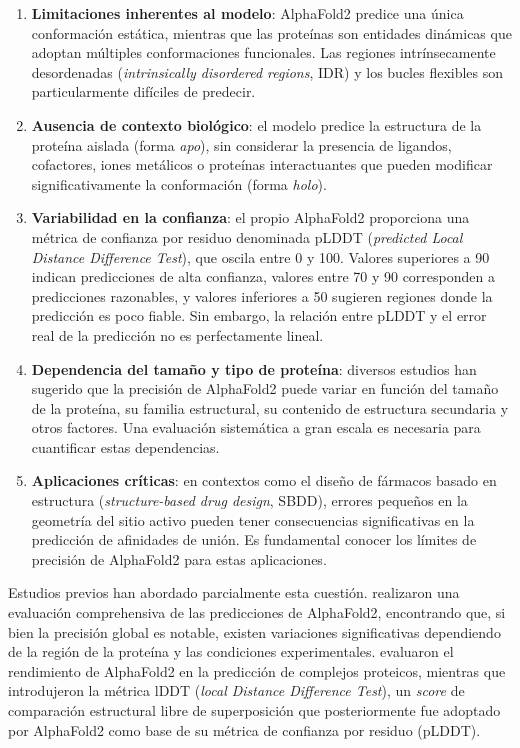 \begin{enumerate}
    \item \textbf{Limitaciones inherentes al modelo}: AlphaFold2 predice una \'unica conformaci\'on est\'atica, mientras que las prote\'inas son entidades din\'amicas que adoptan m\'ultiples conformaciones funcionales. Las regiones intr\'insecamente desordenadas (\textit{intrinsically disordered regions}, IDR) y los bucles flexibles son particularmente dif\'iciles de predecir.

    \item \textbf{Ausencia de contexto biol\'ogico}: el modelo predice la estructura de la prote\'ina aislada (forma \textit{apo}), sin considerar la presencia de ligandos, cofactores, iones met\'alicos o prote\'inas interactuantes que pueden modificar significativamente la conformaci\'on (forma \textit{holo}).

    \item \textbf{Variabilidad en la confianza}: el propio AlphaFold2 proporciona una m\'etrica de confianza por residuo denominada pLDDT (\textit{predicted Local Distance Difference Test}), que oscila entre 0 y 100. Valores superiores a 90 indican predicciones de alta confianza, valores entre 70 y 90 corresponden a predicciones razonables, y valores inferiores a 50 sugieren regiones donde la predicci\'on es poco fiable. Sin embargo, la relaci\'on entre pLDDT y el error real de la predicci\'on no es perfectamente lineal.

    \item \textbf{Dependencia del tama\~no y tipo de prote\'ina}: diversos estudios han sugerido que la precisi\'on de AlphaFold2 puede variar en funci\'on del tama\~no de la prote\'ina, su familia estructural, su contenido de estructura secundaria y otros factores. Una evaluaci\'on sistem\'atica a gran escala es necesaria para cuantificar estas dependencias.

    \item \textbf{Aplicaciones cr\'iticas}: en contextos como el dise\~no de f\'armacos basado en estructura (\textit{structure-based drug design}, SBDD), errores peque\~nos en la geometr\'ia del sitio activo pueden tener consecuencias significativas en la predicci\'on de afinidades de uni\'on. Es fundamental conocer los l\'imites de precisi\'on de AlphaFold2 para estas aplicaciones.
\end{enumerate}

Estudios previos han abordado parcialmente esta cuesti\'on. \citet{akdel2022structural} realizaron una evaluaci\'on comprehensiva de las predicciones de AlphaFold2, encontrando que, si bien la precisi\'on global es notable, existen variaciones significativas dependiendo de la regi\'on de la prote\'ina y las condiciones experimentales. \citet{bryant2022improved} evaluaron el rendimiento de AlphaFold2 en la predicci\'on de complejos proteicos, mientras que \citet{mariani2013lddt} introdujeron la m\'etrica lDDT (\textit{local Distance Difference Test}), un \textit{score} de comparaci\'on estructural libre de superposici\'on que posteriormente fue adoptado por AlphaFold2 como base de su m\'etrica de confianza por residuo (pLDDT).

